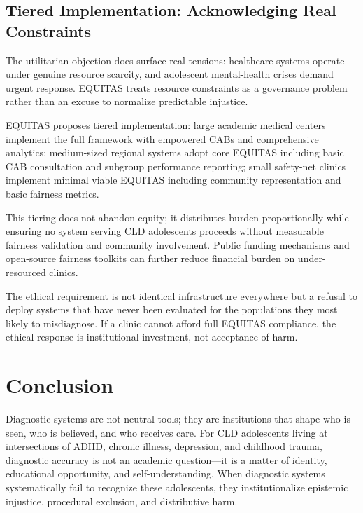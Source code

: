 \documentclass[12pt,a4paper]{article}
\begin{document}
\subsection{Tiered Implementation: Acknowledging Real Constraints}

The utilitarian objection does surface real tensions: healthcare systems operate under genuine resource scarcity, and adolescent mental-health crises demand urgent response.\cite{munn_idai700} EQUITAS treats resource constraints as a governance problem rather than an excuse to normalize predictable injustice.

EQUITAS proposes tiered implementation: large academic medical centers implement the full framework with empowered CABs and comprehensive analytics; medium-sized regional systems adopt core EQUITAS including basic CAB consultation and subgroup performance reporting; small safety-net clinics implement minimal viable EQUITAS including community representation and basic fairness metrics.\cite{lekadir2025}

This tiering does not abandon equity; it distributes burden proportionally while ensuring no system serving CLD adolescents proceeds without measurable fairness validation and community involvement.\cite{lekadir2025} Public funding mechanisms and open-source fairness toolkits can further reduce financial burden on under-resourced clinics.\cite{chen2023}

The ethical requirement is not identical infrastructure everywhere but a refusal to deploy systems that have never been evaluated for the populations they most likely to misdiagnose. If a clinic cannot afford full EQUITAS compliance, the ethical response is institutional investment, not acceptance of harm.\cite{garcia_ed415}

\section{Conclusion}

Diagnostic systems are not neutral tools; they are institutions that shape who is seen, who is believed, and who receives care. For CLD adolescents living at intersections of ADHD, chronic illness, depression, and childhood trauma, diagnostic accuracy is not an academic question—it is a matter of identity, educational opportunity, and self-understanding. When diagnostic systems systematically fail to recognize these adolescents, they institutionalize epistemic injustice, procedural exclusion, and distributive harm.\cite{garcia_ed415}
\end{document}
